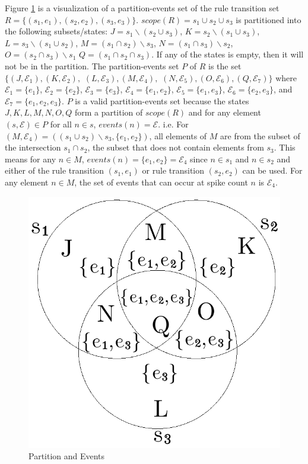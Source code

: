 \documentclass[]{elsarticle}
\theoremstyle{definition}
\theoremstyle{definition}
\newcommand{\ee}{\mathcal{E}}
\begin{document}
Figure \ref{fig-partition-1} is a visualization of a partition-events set of the rule transition
set $R = \{(s_1,e_1),(s_2,e_2),(s_3,e_3)\}$. $scope(R) = s_1 \cup s_2 \cup s_3$ is partitioned into
the following subsets/states:
$J = s_1\backslash (s_2 \cup s_3)$,
$K = s_2\backslash (s_1 \cup s_3)$, 
$L = s_3\backslash (s_1 \cup s_2)$, 
$M = (s_1 \cap s_2 ) \backslash s_3$, 
$N = (s_1 \cap s_3 ) \backslash s_2$, 
$O = (s_2 \cap s_3 ) \backslash s_1$ 
$Q = (s_1 \cap s_2 \cap s_3 )$.
If any of the states is empty, then it will not be in the partition. The partition-events set $P$
of $R$ is the set $\{(J,\ee_1),(K,\ee_2),$ $(L,\ee_3),(M,\ee_4),$ $(N,\ee_5),(O,\ee_6),(Q,\ee_7)\}$ 
where 
$\ee_1 = \{e_1\}$,
$\ee_2 = \{e_2\}$,
$\ee_3 = \{e_3\}$,
$\ee_4 = \{e_1,e_2\}$,
$\ee_5 = \{e_1,e_3\}$,
$\ee_6 = \{e_2,e_3\}$, and
$\ee_7 = \{e_1,e_2,e_3\}$. $P$ is a valid partition-events set because the states $J,K,L,M,N,O,Q$
form a partition of $scope(R)$ and for any element $(s,\ee)\in  P$ for all $n\in s$, $events(n)=\ee$.
i.e. For $(M,\ee_4) = ((s_1 \cup s_2)\backslash s_3,\{e_1,e_2\})$, all elements of $M$ are from the 
subset of the intersection $s_1 \cap s_2$, the subset that does not contain elements from $s_3$. 
This means for any $n \in M$, $events(n) = \{e_1,e_2\} = \ee_4$ since $n\in s_1$ and $n\in s_2$ and 
either of the  rule transition $(s_1,e_1)$ or rule transition $(s_2,e_2)$ can be used. For any 
element $n\in M$, the set of events that can occur at spike count $n$ is $\ee_4$.

\begin{figure}[H]
    \centering
    \includegraphics[scale=0.45]{fig-partitions-1.pdf}
    \caption{Partition and Events}
    \label{fig-partition-1}
\end{figure}
\end{document}

